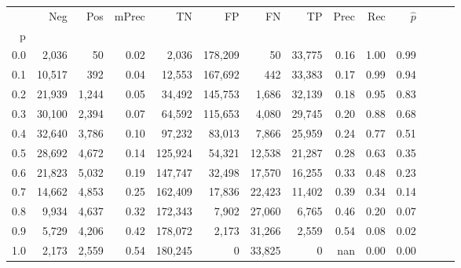 \begin{tabular}{rrrrrrrrrrrrrr}
\toprule
{} &     Neg &    Pos & mPrec &       TN &       FP &      FN &      TP &  Prec &   Rec & $\hat{p}$ \\
p   &         &        &       &          &          &         &         &       &       &           \\
\midrule
0.0 &   2,036 &     50 &  0.02 &    2,036 &  178,209 &      50 &  33,775 &  0.16 &  1.00 &      0.99 \\
0.1 &  10,517 &    392 &  0.04 &   12,553 &  167,692 &     442 &  33,383 &  0.17 &  0.99 &      0.94 \\
0.2 &  21,939 &  1,244 &  0.05 &   34,492 &  145,753 &   1,686 &  32,139 &  0.18 &  0.95 &      0.83 \\
0.3 &  30,100 &  2,394 &  0.07 &   64,592 &  115,653 &   4,080 &  29,745 &  0.20 &  0.88 &      0.68 \\
0.4 &  32,640 &  3,786 &  0.10 &   97,232 &   83,013 &   7,866 &  25,959 &  0.24 &  0.77 &      0.51 \\
0.5 &  28,692 &  4,672 &  0.14 &  125,924 &   54,321 &  12,538 &  21,287 &  0.28 &  0.63 &      0.35 \\
0.6 &  21,823 &  5,032 &  0.19 &  147,747 &   32,498 &  17,570 &  16,255 &  0.33 &  0.48 &      0.23 \\
0.7 &  14,662 &  4,853 &  0.25 &  162,409 &   17,836 &  22,423 &  11,402 &  0.39 &  0.34 &      0.14 \\
0.8 &   9,934 &  4,637 &  0.32 &  172,343 &    7,902 &  27,060 &   6,765 &  0.46 &  0.20 &      0.07 \\
0.9 &   5,729 &  4,206 &  0.42 &  178,072 &    2,173 &  31,266 &   2,559 &  0.54 &  0.08 &      0.02 \\
1.0 &   2,173 &  2,559 &  0.54 &  180,245 &        0 &  33,825 &       0 &   nan &  0.00 &      0.00 \\
\bottomrule
\end{tabular}
